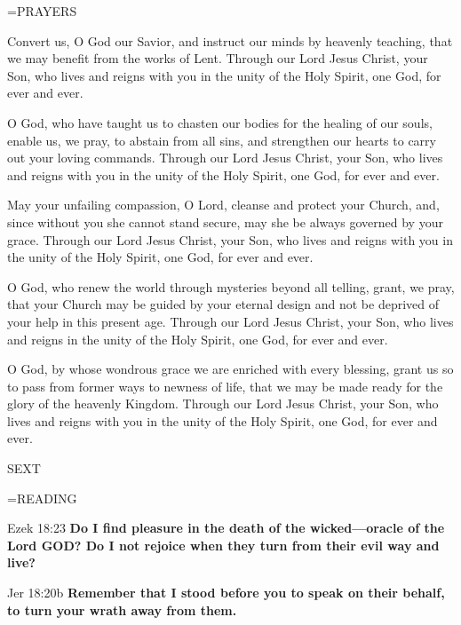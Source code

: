 \hangindent=\parindent \small PRAYERS
\begin{description}[labelindent=\parindent, noitemsep, leftmargin=*]
\item [Week 1:] 	Convert us, O God our Savior, and instruct our minds by heavenly teaching, that we may benefit from the works of Lent. Through our Lord Jesus Christ, your Son, who lives and reigns with you in the unity of the Holy Spirit, one God, for ever and ever.
\item [Week 2:] 	O God, who have taught us to chasten our bodies for the healing of our souls, enable us, we pray, to abstain from all sins, and strengthen our hearts to carry out your loving commands. Through our Lord Jesus Christ, your Son, who lives and reigns with you in the unity of the Holy Spirit, one God, for ever and ever.
\item [Week 3:] 	May your unfailing compassion, O Lord, cleanse and protect your Church, and, since without you she cannot stand secure, may she be always governed by your grace. Through our Lord Jesus Christ, your Son, who lives and reigns with you in the unity of the Holy Spirit, one God, for ever and ever.
\item [Week 4:] 	O God, who renew the world through mysteries beyond all telling, grant, we pray, that your Church may be guided by your eternal design and not be deprived of your help in this present age. Through our Lord Jesus Christ, your Son, who lives and reigns in the unity of the Holy Spirit, one God, for ever and ever.
\item [Week 5:] 	O God, by whose wondrous grace we are enriched with every blessing, grant us so to pass from former ways to newness of life, that we may be made ready for the glory of the heavenly Kingdom. Through our Lord Jesus Christ, your Son, who lives and reigns with you in the unity of the Holy Spirit, one God, for ever and ever.
\end{description}

\begin{flushleft}\normalsize SEXT\\\end{flushleft}

\hangindent=\parindent \small READING
\begin{description}[labelindent=\parindent, leftmargin=*]
\item [Weeks 1-4:]     Ezek 18:23 \textbf{    Do I find pleasure in the death of the wicked—oracle of the Lord GOD? Do I not rejoice when they turn from their evil way and live? }
\item [Week 5:]     Jer 18:20b \textbf{    Remember that I stood before you to speak on their behalf, to turn your wrath away from them.}
\end{description}


